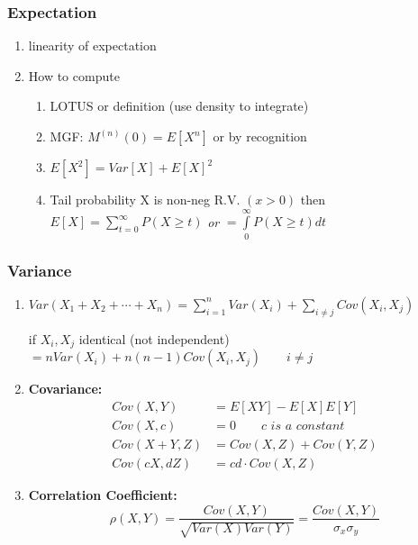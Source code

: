 \subsubsection*{Expectation}
\begin{enumerate}[label=\protect\circled{\arabic*}]
	\item linearity of expectation
	\item How to compute
	\begin{enumerate}
		\item LOTUS or definition (use density to integrate)
		\item MGF: $M^{(n)}(0) = E[X^n]$ or by recognition
		\item $E[X^2] = Var[X] + E[X]^2$
		\item Tail probability X is non-neg R.V. $(x>0)$ then $E[X] = \sum\limits_{t=0}^\infty P(X \geq t)$ \textit{or} $= \int\limits_0^\infty P(X \geq t) dt$
	\end{enumerate}
\end{enumerate}
\subsubsection*{Variance}
\begin{enumerate}[label=\protect\circled{\arabic*}]
	\item $Var(X_1 + X_2 + \cdots + X_n) = \sum\limits_{i=1}^n Var(X_i) + \sum\limits_{i \neq j} Cov(X_i, X_j)$
	\begin{center}
		if $X_i, X_j$ identical (not independent) $ = n Var(X_i) + n(n-1)Cov(X_i, X_j) \quad \quad i\neq j$
	\end{center}
	\item \textbf{Covariance: }
	\begin{align*}
		Cov(X,Y) & = E[XY] - E[X]E[Y]\\
		Cov(X,c) & = 0 \quad \quad c \textit{ is a constant}\\
		Cov(X+Y,Z) & = Cov(X,Z) + Cov(Y,Z)\\
		Cov(cX,dZ) & = cd \cdot Cov(X,Z) 
	\end{align*}
	\item \textbf{Correlation Coefficient:}
	\begin{equation*}
		\rho(X,Y) = \frac{Cov(X,Y)}{\sqrt{Var(X) Var(Y)}} = \frac{Cov(X,Y)}{\sigma_x \sigma_y}
	\end{equation*}
\end{enumerate}
